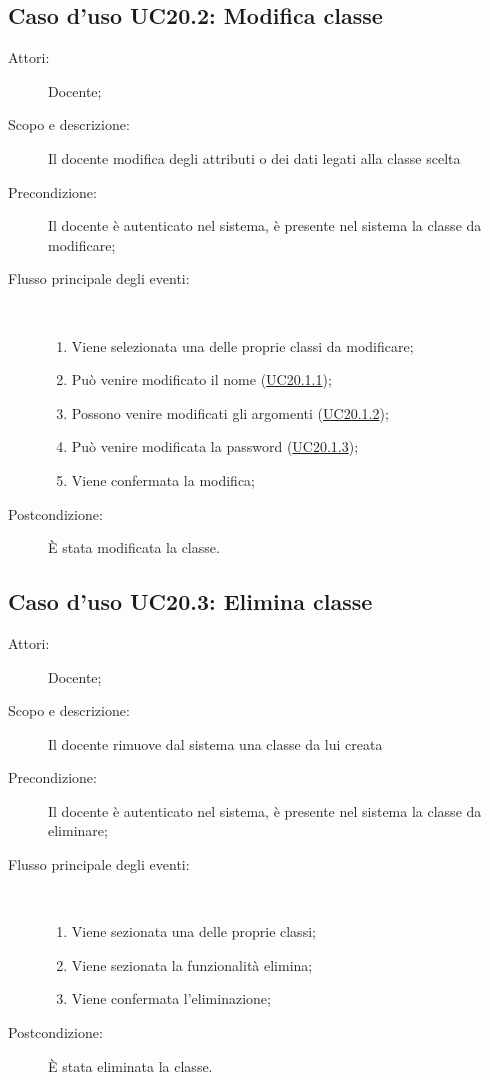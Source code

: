 \subsection{Caso d'uso UC20.2: Modifica classe}\begin{description}
	\item[Attori:] Docente;
	\item[Scopo e descrizione:] Il docente modifica degli attributi o dei dati legati alla classe scelta
	\item[Precondizione:] Il docente è autenticato nel sistema, è presente nel sistema la classe da modificare;
	
	\item[Flusso principale degli eventi:] \ 
	\begin{enumerate}
		\item Viene selezionata una delle proprie classi da modificare;
		\item Può venire modificato il nome (\hyperlink{UC20.1.1}{UC20.1.1});
		\item Possono venire modificati gli argomenti (\hyperlink{UC20.1.2}{UC20.1.2});
		\item Può venire modificata la password (\hyperlink{UC20.1.3}{UC20.1.3});
		\item Viene confermata la modifica;
		
	\end{enumerate}
	\item[Postcondizione:] È stata modificata la classe.
\end{description}
\hypertarget{UC20.3}{}
\subsection{Caso d'uso UC20.3: Elimina classe}\begin{description}
	\item[Attori:] Docente;
	\item[Scopo e descrizione:] Il docente rimuove dal sistema una classe da lui creata 
	\item[Precondizione:] Il docente è autenticato nel sistema, è presente nel sistema la classe da eliminare;
	
	\item[Flusso principale degli eventi:] \ 
	\begin{enumerate}
		\item Viene sezionata una delle proprie classi;
		\item Viene sezionata la funzionalità elimina;
		\item Viene confermata l'eliminazione;
		
	\end{enumerate}
	\item[Postcondizione:] È stata eliminata la classe.
\end{description}
\hypertarget{UC20.4}{}
